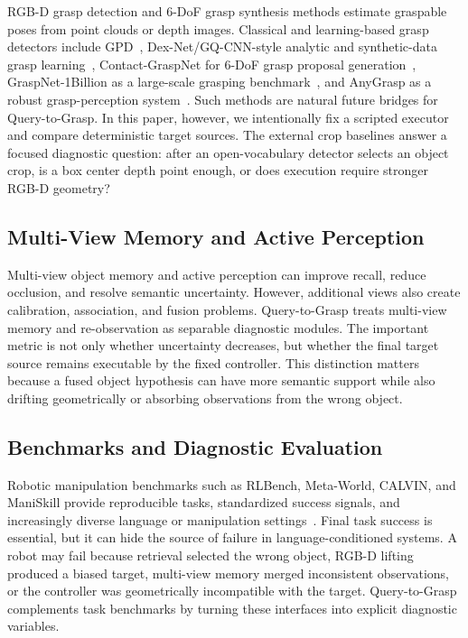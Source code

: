 \documentclass[preprint,12pt]{elsarticle}
\begin{document}
RGB-D grasp detection and 6-DoF grasp synthesis methods estimate graspable
poses from point clouds or depth images. Classical and learning-based grasp
detectors include GPD~\cite{tenpas2017gpd}, Dex-Net/GQ-CNN-style analytic and
synthetic-data grasp learning~\cite{mahler2017dexnet}, Contact-GraspNet for
6-DoF grasp proposal generation~\cite{sundermeyer2021contactgraspnet},
GraspNet-1Billion as a large-scale grasping benchmark~\cite{fang2023graspnet},
and AnyGrasp as a robust grasp-perception system~\cite{fang2023anygrasp}. Such
methods are natural future bridges for Query-to-Grasp. In this paper, however,
we intentionally fix a scripted executor and compare deterministic target
sources. The external crop baselines answer a focused diagnostic question:
after an open-vocabulary detector selects an object crop, is a box center depth
point enough, or does execution require stronger RGB-D geometry?

\subsection{Multi-View Memory and Active Perception}

Multi-view object memory and active perception can improve recall, reduce
occlusion, and resolve semantic uncertainty. However, additional views also
create calibration, association, and fusion problems. Query-to-Grasp treats
multi-view memory and re-observation as separable diagnostic modules. The
important metric is not only whether uncertainty decreases, but whether the
final target source remains executable by the fixed controller. This distinction
matters because a fused object hypothesis can have more semantic support while
also drifting geometrically or absorbing observations from the wrong object.

\subsection{Benchmarks and Diagnostic Evaluation}

Robotic manipulation benchmarks such as RLBench, Meta-World, CALVIN, and
ManiSkill provide reproducible tasks, standardized success signals, and
increasingly diverse language or manipulation settings~\cite{james2020rlbench,
yu2020metaworld, mees2022calvin, gu2023maniskill2}. Final task success is
essential, but it can hide the source of failure in language-conditioned
systems. A robot may fail because retrieval selected the wrong object, RGB-D
lifting produced a biased target, multi-view memory merged inconsistent
observations, or the controller was geometrically incompatible with the target.
Query-to-Grasp complements task benchmarks by turning these interfaces into
explicit diagnostic variables.
\end{document}
